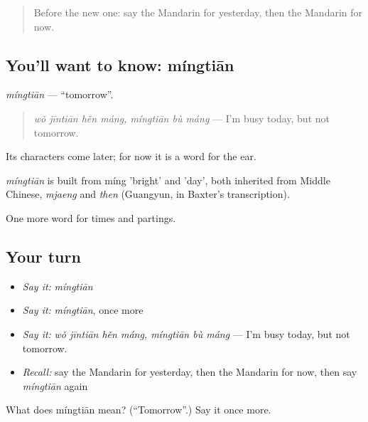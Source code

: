 \label{lesson:ZH-C45-mingtian}



\begin{quote}
Before the new one: say the Mandarin for yesterday, then the Mandarin for now.
\end{quote}

\subsection*{You'll want to know: míngtiān}
\emph{míngtiān} — \textquotedblleft{}tomorrow\textquotedblright{}.

\begin{quote}
\emph{wǒ jīntiān hěn máng, míngtiān bù máng} — I'm busy today, but not tomorrow.
\end{quote}

Its characters come later; for now it is a word for the ear.

\begin{cousinweb}
\emph{míngtiān} is built from míng 'bright' and  'day', both inherited from Middle Chinese, \emph{mjaeng} and \emph{then} (Guangyun, in Baxter's transcription).
\end{cousinweb}

\begin{grammarlens}[title={What you've built}]
One more word for times and partings.
\end{grammarlens}

\subsection*{Your turn}
\begin{itemize}
\raggedright
  \item \emph{Say it:} \emph{míngtiān}
  \item \emph{Say it:} \emph{míngtiān}, once more
  \item \emph{Say it:} \emph{wǒ jīntiān hěn máng, míngtiān bù máng} — I'm busy today, but not tomorrow.
  \item \emph{Recall:} say the Mandarin for yesterday, then the Mandarin for now, then say \emph{míngtiān} again
\end{itemize}

\begin{tcolorbox}[breakable,colback=teal!4,colframe=teal!35!black,title={Before you move on}]
What does míngtiān mean? (\textquotedblleft{}Tomorrow\textquotedblright{}.) Say it once more.
\end{tcolorbox}
